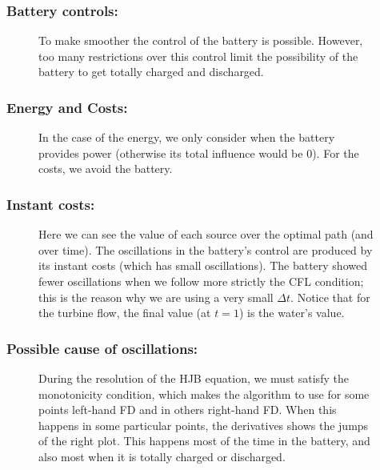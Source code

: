\documentclass[aspectratio=169]{beamer}\usepackage[utf8]{inputenc}
\begin{document}
\begin{frame}\frametitle{Battery controls:}
\begin{figure}[ht!]
\centering
{}
\caption{To make smoother the control of the battery is possible. However, too many restrictions over this control limit the possibility of the battery to get totally charged and discharged.}
\end{figure}
\end{frame}

\begin{frame}\frametitle{Energy and Costs:}
\begin{figure}[ht!]
\centering
{}
\caption{In the case of the energy, we only consider when the battery provides power (otherwise its total influence would be 0). For the costs, we avoid the battery.}
\end{figure}
\end{frame}

\begin{frame}\frametitle{Instant costs:}
\begin{figure}[ht!]
\centering
{}
\caption{Here we can see the value of each source over the optimal path (and over time). The oscillations in the battery's control are produced by its instant costs (which has small oscillations). The battery showed fewer oscillations when we follow more strictly the CFL condition; this is the reason why we are using a very small $\Delta t$. Notice that for the turbine flow, the final value (at $t=1$) is the water's value.}
\end{figure}
\end{frame}

\begin{frame}\frametitle{Possible cause of oscillations:}
\begin{figure}[ht!]
\centering
{}
\caption{During the resolution of the HJB equation, we must satisfy the monotonicity condition, which makes the algorithm to use for some points left-hand FD and in others right-hand FD. When this happens in some particular points, the derivatives shows the jumps of the right plot. This happens most of the time in the battery, and also most when it is totally charged or discharged.}
\end{figure}
\end{frame}
\end{document}
